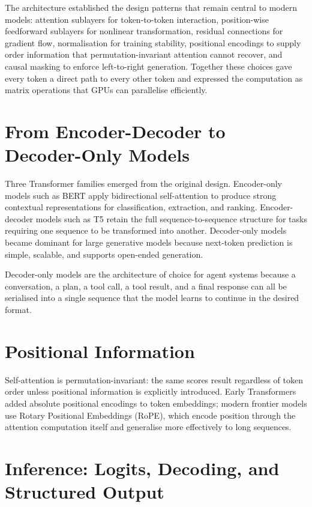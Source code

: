 The architecture established the design patterns that remain central to modern models:
attention sublayers for token-to-token interaction, position-wise feedforward sublayers
for nonlinear transformation, residual connections for gradient flow, normalisation for
training stability, positional encodings to supply order information that
permutation-invariant attention cannot recover, and causal masking to enforce
left-to-right generation. Together these choices gave every token a direct path to every
other token and expressed the computation as matrix operations that GPUs can parallelise
efficiently.

\section{From Encoder-Decoder to Decoder-Only Models}

Three Transformer families emerged from the original design. Encoder-only models such as
BERT apply bidirectional self-attention to produce strong contextual representations for
classification, extraction, and ranking. Encoder-decoder models such as T5 retain the
full sequence-to-sequence structure for tasks requiring one sequence to be transformed
into another. Decoder-only models became dominant for large generative models because
next-token prediction is simple, scalable, and supports open-ended generation.

Decoder-only models are the architecture of choice for agent systems because a
conversation, a plan, a tool call, a tool result, and a final response can all be
serialised into a single sequence that the model learns to continue in the desired
format.

\section{Positional Information}

Self-attention is permutation-invariant: the same scores result regardless of token
order unless positional information is explicitly introduced. Early Transformers added
absolute positional encodings to token embeddings; modern frontier models use Rotary
Positional Embeddings (RoPE), which encode position through the attention computation
itself and generalise more effectively to long sequences.

\section{Inference: Logits, Decoding, and Structured Output}

